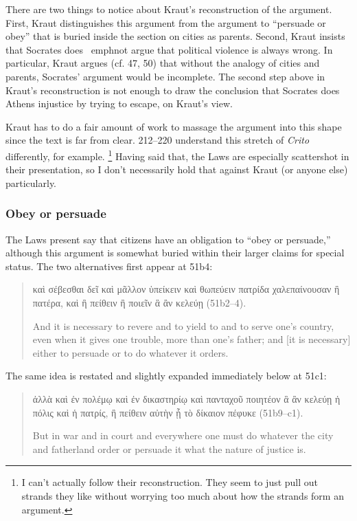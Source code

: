 \documentclass[12pt,letterpaper]{article}
\begin{document}
There are two things to notice about Kraut's reconstruction of the argument.
 First, Kraut distinguishes this argument from the argument to ``persuade or obey'' that is buried inside the section on cities as parents.
 Second, Kraut insists that Socrates does \
emph{not} argue that political violence is always wrong.
 In particular, Kraut argues (cf.
 47, 50) that without the analogy of cities and parents, Socrates' argument would be incomplete.
 The second step above in Kraut's reconstruction is not enough to draw the conclusion that Socrates does Athens injustice by trying to escape, on Kraut's view.


Kraut has to do a fair amount of work to massage the argument into this shape since the text is far from clear.%
\cite{brickhouse-smith2004-plato-trial-of-socrates} 212--220 understand this stretch of \textit{Crito} differently, for example.%
\footnote{I can't actually follow their reconstruction.
They seem to just pull out strands they like without worrying too much about how the strands form an argument.}
Having said that, the Laws are especially scattershot in their presentation, so I don't necessarily hold that against Kraut (or anyone else) particularly.

\subsubsection*{Obey or persuade}

The Laws present say that citizens have an obligation to ``obey or persuade,'' although this argument is somewhat buried within their larger claims for special status.
The two alternatives first appear at 51b4:

\begin{quote}

    \textgreek{καὶ σέβεσθαι δεῖ καὶ μᾶλλον ὑπείκειν καὶ θωπεύειν πατρίδα χαλεπαίνουσαν ἢ πατέρα, καὶ ἢ πείθειν ἢ ποιεῖν ἃ ἂν κελεύῃ} (51b2--4).

    And it is necessary to revere and to yield to and to serve one's country, even when it gives one trouble, more than one's father; and [it is necessary] either to persuade or to do whatever it orders.

\end{quote}

The same idea is restated and slightly expanded immediately below at 51c1:

\begin{quote}

    \textgreek{ἀλλὰ καὶ ἐν πολέμῳ καὶ ἐν δικαστηρίῳ καὶ πανταχοῦ ποιητέον ἃ ἂν κελεύῃ ἡ πόλις καὶ ἡ πατρίς, ἢ πείθειν αὐτὴν ᾗ τὸ δίκαιον πέφυκε} (51b9--c1).

    But in war and in court and everywhere one must do whatever the city and fatherland order or persuade it what the nature of justice is.

\end{quote}
\end{document}
